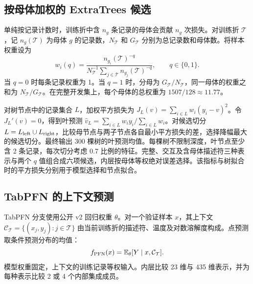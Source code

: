 \subsection{按母体加权的 ExtraTrees 候选}
单纯按记录计数时，训练折中含 $n_g$ 条记录的母体会贡献 $n_g$ 次损失。对训练折 $\mathcal T$，记 $n_g(\mathcal T)$ 为母体 $g$ 的记录数，$N_{\mathcal T}$ 和 $G_{\mathcal T}$ 分别为总记录数和母体数。将样本权重设为
\begin{equation}
w_i(q)=\frac{n_{g_i}(\mathcal T)^{-q}}
{N_{\mathcal T}^{-1}\sum_{j\in\mathcal T}n_{g_j}(\mathcal T)^{-q}},
\qquad q\in\{0,1\}.
\end{equation}
当 $q=0$ 时每条记录权重为 1。当 $q=1$ 时，分母为 $G_{\mathcal T}/N_{\mathcal T}$，同一母体的权重之和为 $N_{\mathcal T}/G_{\mathcal T}$。在完整开发集上，每个母体的总权重为 $1507/128\approx 11.77$。

对树节点中的记录集合 $L$，加权平方损失为 $J_L(v)=\sum_{i\in L}w_i(y_i-v)^2$。令 $J_L'(v)=0$，得到叶预测 $\hat v_L=\sum_{i\in L}w_i y_i/\sum_{i\in L}w_i$。对候选切分 $L=L_{\rm left}\cup L_{\rm right}$，比较母节点与两子节点各自最小平方损失的差，选择降幅最大的候选切分。最终输出 300 棵树的叶预测均值。每棵树不限制深度，叶节点至少含 2 条记录，每次切分考虑 0.7 比例的特征。完整、交互及含母体描述符三种表示与两个 $q$ 值组合成六项候选，内层按母体等权绝对误差选择。该指标与树拟合时的平方损失分别用于模型选择和节点拟合。

\subsection{TabPFN 的上下文预测}
TabPFN 分支使用公开 v2 回归权重 $\theta$。对一个验证样本 $x$，其上下文 $\mathcal C_{\mathcal T}=\{(x_j,y_j):j\in\mathcal T\}$ 由当前训练折的描述符、温度及对数溶解度构成。点预测取条件预测分布的均值\cite{tabpfn2025}：
\begin{equation}
f_{\rm PFN}(x)=\mathbb E_{\theta}[Y\mid x,\mathcal C_{\mathcal T}].
\end{equation}
模型权重固定，上下文的训练记录等权输入。内层比较 23 维与 435 维表示，并为每种表示比较 2 或 4 个内部集成成员。

